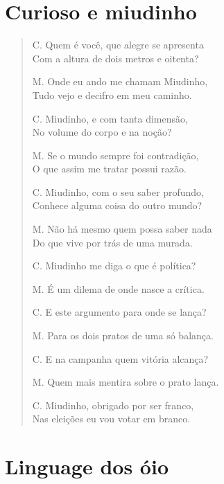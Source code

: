 \chapter{Curioso e miudinho}

\begin{verse}
C. Quem é você, que alegre se apresenta\\
Com a altura de dois metros e oitenta?

M. Onde eu ando me chamam Miudinho,\\
Tudo vejo e decifro em meu caminho.

C. Miudinho, e com tanta dimensão,\\
No volume do corpo e na noção?

M. Se o mundo sempre foi contradição,\\
O que assim me tratar possui razão.

C. Miudinho, com o seu saber profundo,\\
Conhece alguma coisa do outro mundo?

M. Não há mesmo quem possa saber nada\\
Do que vive por trás de uma murada.

C. Miudinho me diga o que é política?

M. É um dilema de onde nasce a crítica.

C. E este argumento para onde se lança?

M. Para os dois pratos de uma só balança.

C. E na campanha quem vitória alcança?

M. Quem mais mentira sobre o prato lança.

C. Miudinho, obrigado por ser franco,\\
Nas eleições eu vou votar em branco.
\end{verse}

\chapter{Linguage dos óio}

